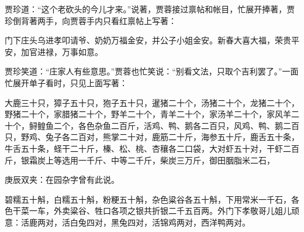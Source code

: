 \begin{parag}
    贾珍道：“这个老砍头的今儿才来。”说著，贾蓉接过禀帖和帐目，忙展开捧著，贾珍倒背著两手，向贾蓉手内只看红禀帖上写著：
\end{parag}


\begin{qute2sp}
    门下庄头乌进孝叩请爷、奶奶万福金安，并公子小姐金安。新春大喜大福，荣贵平安，加官进禄，万事如意。
\end{qute2sp}


\begin{parag}
    贾珍笑道：“庄家人有些意思。”贾蓉也忙笑说：“别看文法，只取个吉利罢了。”一面忙展开单子看时，只见上面写著：
\end{parag}


\begin{qute2sp}
    大鹿三十只，獐子五十只，狍子五十只，暹猪二十个，汤猪二十个，龙猪二十个，野猪二十个，家腊猪二十个，野羊二十个，青羊二十个，家汤羊二十个，家风羊二十个，鲟鳇鱼二个，各色杂鱼二百斤，活鸡、鸭、鹅各二百只，风鸡、鸭、鹅二百只，野鸡、兔子各二百对，熊掌二十对，鹿筋二十斤，海参五十斤，鹿舌五十条，牛舌五十条，蛏干二十斤，榛、松、桃、杏穰各二口袋，大对虾五十对，干虾二百斤，银霜炭上等选用一千斤、中等二千斤，柴炭三万斤，御田胭脂米二石，\begin{note}庚辰双夹：在园杂字曾有此说。\end{note}碧糯五十斛，白糯五十斛，粉粳五十斛，杂色粱谷各五十斛，下用常米一千石，各色干菜一车，外卖粱谷、牲口各项之银共折银二千五百两。外门下孝敬哥儿姐儿顽意：活鹿两对，活白兔四对，黑兔四对，活锦鸡两对，西洋鸭两对。
\end{qute2sp}


